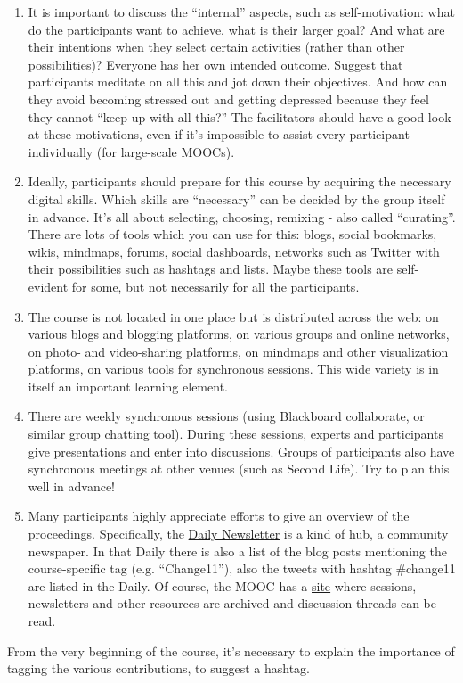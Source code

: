 \begin{enumerate}
\item
  It is important to discuss the ``internal'' aspects, such as
  self-motivation: what do the participants want to achieve, what is
  their larger goal? And what are their intentions when they select
  certain activities (rather than other possibilities)? Everyone has her
  own intended outcome. Suggest that participants meditate on all this
  and jot down their objectives. And how can they avoid becoming
  stressed out and getting depressed because they feel they cannot
  ``keep up with all this?'' The facilitators should have a good look at
  these motivations, even if it's impossible to assist every participant
  individually (for large-scale MOOCs).
\item
  Ideally, participants should prepare for this course by acquiring the
  necessary digital skills. Which skills are ``necessary'' can be
  decided by the group itself in advance. It's all about selecting,
  choosing, remixing - also called ``curating''. There are lots of tools
  which you can use for this: blogs, social bookmarks, wikis, mindmaps,
  forums, social dashboards, networks such as Twitter with their
  possibilities such as hashtags and lists. Maybe these tools are
  self-evident for some, but not necessarily for all the participants.
\item
  The course is not located in one place but is distributed across the
  web: on various blogs and blogging platforms, on various groups and
  online networks, on photo- and video-sharing platforms, on mindmaps
  and other visualization platforms, on various tools for synchronous
  sessions. This wide variety is in itself an important learning
  element.
\item
  There are weekly synchronous sessions (using Blackboard collaborate,
  or similar group chatting tool). During these sessions, experts and
  participants give presentations and enter into discussions. Groups of
  participants also have synchronous meetings at other venues (such as
  Second Life). Try to plan this well in advance!
\item
  Many participants highly appreciate efforts to give an overview of the
  proceedings. Specifically, the
  \href{http://change.mooc.ca/newsletter.htm}{Daily Newsletter} is a
  kind of hub, a community newspaper. In that Daily there is also a list
  of the blog posts mentioning the course-specific tag (e.g.
  ``Change11''), also the tweets with hashtag \#change11 are listed in
  the Daily. Of course, the MOOC has a
  \href{http://change.mooc.ca/index.html}{site} where sessions,
  newsletters and other resources are archived and discussion threads
  can be read.
\end{enumerate}
From the very beginning of the course, it's necessary to explain the
importance of tagging the various contributions, to suggest a hashtag.

